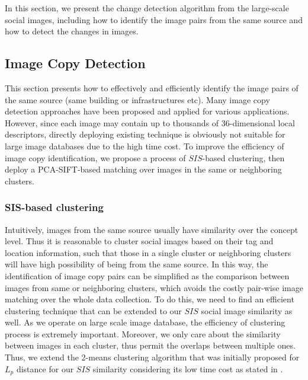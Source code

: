 \documentclass[runningheads,a4paper]{llncs}
\begin{document}
In this section, we present the change detection algorithm from the large-scale social images, 
including how to identify the image pairs from the same source and how to detect the changes in images.


\subsection{Image Copy Detection}

This section presents how to effectively and efficiently identify the image pairs of the same source (same building or infrastructures etc). 
Many image copy detection approaches have been proposed and applied for various applications. 
However,  since each image may contain up to thousands of 36-dimensional local descriptors, 
directly deploying existing technique is obviously not suitable for large image databases due to the high time cost. 
To improve the efficiency of image copy identification, 
we propose a process of $SIS$-based clustering,
then deploy a PCA-SIFT-based matching over images in the same or neighboring clusters.

\subsubsection{SIS-based clustering}

Intuitively, images from the same source usually have similarity over the concept level. 
Thus it is reasonable to cluster social images based on their tag and location information, 
such that those in a single cluster or neighboring clusters will have high possibility of being from the same source. 
In this way, the identification of image copy pairs can be simplified as the comparison between images from same or neighboring clusters, 
which avoids the costly pair-wise image matching over the whole data collection. 
To do this, we need to find an efficient clustering technique that can be extended to our $SIS$ social image similarity as well. 
As we operate on large scale image database, the efficiency of clustering process is extremely important. 
Moreover, we only care about the similarity between images in each cluster, thus permit the overlaps between multiple ones. Thus, we extend the 2-means clustering algorithm that was initially proposed for $L_p$ distance for our $SIS$ similarity considering its low time cost as stated in \cite{DBLP:conf/sigmod/ShenZH05,DBLP:journals/tkde/ZhouZCSBT10}. 
\end{document}
